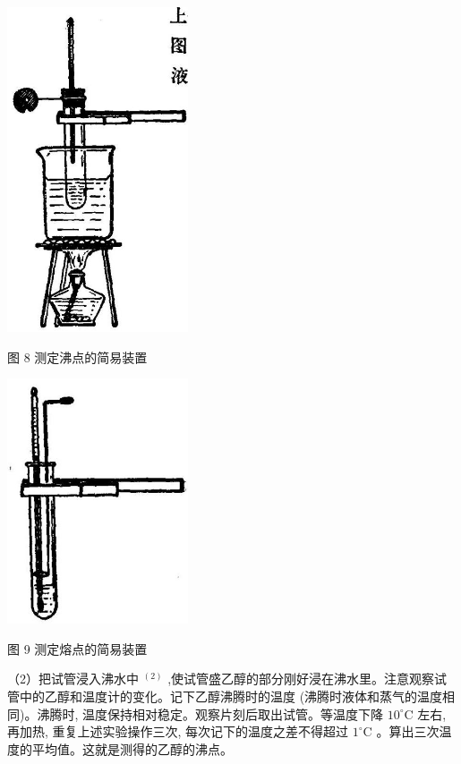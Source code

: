 \documentclass[10pt]{article}
\begin{document}
\begin{center}
\includegraphics[max width=0.4\textwidth]{images/01912d16-be99-77bb-9535-4f3ed8d9946f_225_825446.jpg}
\end{center}

图 8 测定沸点的简易装置

\begin{center}
\includegraphics[max width=0.4\textwidth]{images/01912d16-be99-77bb-9535-4f3ed8d9946f_225_680855.jpg}
\end{center}

图 9 测定熔点的简易装置

（2）把试管浸入沸水中 \({}^{\left( 2\right) }\) ,使试管盛乙醇的部分刚好浸在沸水里。注意观察试管中的乙醇和温度计的变化。记下乙醇沸腾时的温度 (沸腾时液体和蒸气的温度相同)。沸腾时, 温度保持相对稳定。观察片刻后取出试管。等温度下降 \({10}^{ \circ }\mathrm{C}\) 左右, 再加热, 重复上述实验操作三次, 每次记下的温度之差不得超过 \({1}^{ \circ }\mathrm{C}\) 。算出三次温度的平均值。这就是测得的乙醇的沸点。
\end{document}
